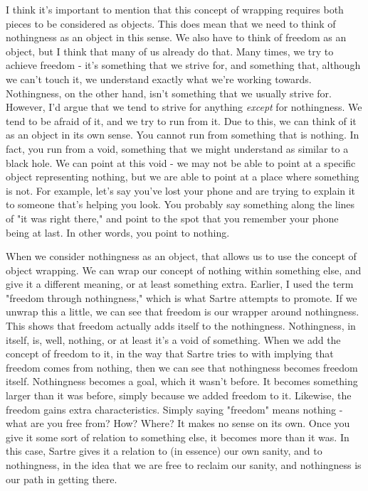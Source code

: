 \documentclass[12pt]{article}
\begin{document}
  I think it's important to mention that this concept of wrapping requires both pieces to be considered as objects.
  This does mean that we need to think of nothingness as an object in this sense. We also have to think of freedom
  as an object, but I think that many of us already do that. Many times, we try to achieve freedom - it's something
  that we strive for, and something that, although we can't touch it, we understand exactly what we're working
  towards. Nothingness, on the other hand, isn't something that we usually strive for. However, I'd argue that we
  tend to strive for anything \textit{except} for nothingness. We tend to be afraid of it, and we try to run from it.
  Due to this, we can think of it as an object in its own sense. You cannot run from something that
  is nothing. In fact, you run from a void, something that we might understand as similar to a black hole. We can
  point at this void - we may not be able to point at a specific object representing nothing, but we are able to
  point at a place where something is not. For example, let's say you've lost your phone and are trying to explain
  it to someone that's helping you look. You probably say something along the lines of "it was right there," and
  point to the spot that you remember your phone being at last. In other words, you point to nothing.

  When we consider nothingness as an object, that allows us to use the concept of object wrapping. We can wrap our
  concept of nothing within something else, and give it a different meaning, or at least something extra. Earlier,
  I used the term "freedom through nothingness," which is what Sartre attempts to promote. If we unwrap this a little,
  we can see that freedom is our wrapper around nothingness. This shows that freedom actually adds itself to
  the nothingness. Nothingness, in itself, is, well, nothing, or at least it's a void of something. When we add the
  concept of freedom to it, in the way that Sartre tries to with implying that freedom comes from nothing, then we
  can see that nothingness becomes freedom itself. Nothingness becomes a goal, which it wasn't before. It becomes
  something larger than it was before, simply because we added freedom to it. Likewise, the freedom gains extra
  characteristics. Simply saying "freedom" means nothing - what are you free from? How? Where? It makes no sense
  on its own. Once you give it some sort of relation to something else, it becomes more than it was. In this case,
  Sartre gives it a relation to (in essence) our own sanity, and to nothingness, in the idea that we are free to 
  reclaim our sanity, and nothingness is our path in getting there.
\end{document}
